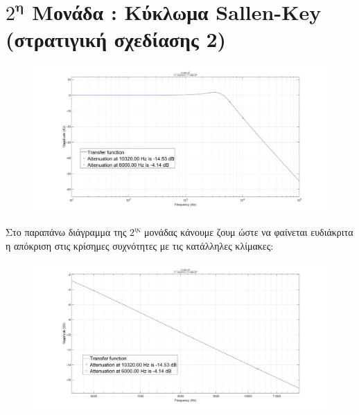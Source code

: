 \documentclass{article}
\begin{document}
{\section*{$2^\textbf{η}$ Μονάδα : Κύκλωμα Sallen-Key \\ (στρατιγική σχεδίασης 2)} 
  \begin{figure}[h!]
\centering
 	\advance\leftskip-4cm
  \includegraphics[width=190mm,scale=2]{t2.jpg}
\end{figure} 
\normalsize{}
Στο παραπάνω διάγραμμα της $2^{ης}$ μονάδας κάνουμε ζουμ ώστε να φαίνεται ευδιάκριτα η απόκριση στις κρίσημες συχνότητες με τις κατάλληλες κλίμακες:
\large{}
 \begin{figure}[h!]
\centering
 	\advance\leftskip-1cm
  \includegraphics[width=120mm,scale=2]{z2.jpg}
\end{figure}
\newpage
}
\end{document}
